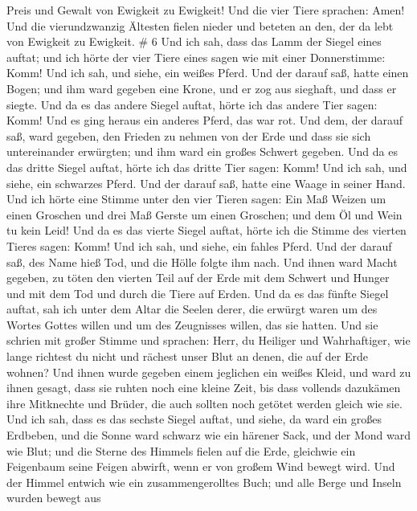 Preis und Gewalt von Ewigkeit zu Ewigkeit!  Und die vier
Tiere sprachen: Amen! Und die vierundzwanzig Ältesten fielen nieder und
beteten an den, der da lebt von Ewigkeit zu Ewigkeit. \# 6 
Und ich sah, dass das Lamm der Siegel eines auftat; und ich hörte der
vier Tiere eines sagen wie mit einer Donnerstimme: Komm! 
Und ich sah, und siehe, ein weißes Pferd. Und der darauf saß, hatte
einen Bogen; und ihm ward gegeben eine Krone, und er zog aus sieghaft,
und dass er siegte.  Und da es das andere Siegel auftat,
hörte ich das andere Tier sagen: Komm!  Und es ging heraus
ein anderes Pferd, das war rot. Und dem, der darauf saß, ward gegeben,
den Frieden zu nehmen von der Erde und dass sie sich untereinander
erwürgten; und ihm ward ein großes Schwert gegeben.  Und da
es das dritte Siegel auftat, hörte ich das dritte Tier sagen: Komm! Und
ich sah, und siehe, ein schwarzes Pferd. Und der darauf saß, hatte eine
Waage in seiner Hand.  Und ich hörte eine Stimme unter den
vier Tieren sagen: Ein Maß Weizen um einen Groschen und drei Maß Gerste
um einen Groschen; und dem Öl und Wein tu kein Leid!  Und da
es das vierte Siegel auftat, hörte ich die Stimme des vierten Tieres
sagen: Komm!  Und ich sah, und siehe, ein fahles Pferd. Und
der darauf saß, des Name hieß Tod, und die Hölle folgte ihm nach. Und
ihnen ward Macht gegeben, zu töten den vierten Teil auf der Erde mit dem
Schwert und Hunger und mit dem Tod und durch die Tiere auf Erden.
 Und da es das fünfte Siegel auftat, sah ich unter dem Altar
die Seelen derer, die erwürgt waren um des Wortes Gottes willen und um
des Zeugnisses willen, das sie hatten.  Und sie schrien mit
großer Stimme und sprachen: Herr, du Heiliger und Wahrhaftiger, wie
lange richtest du nicht und rächest unser Blut an denen, die auf der
Erde wohnen?  Und ihnen wurde gegeben einem jeglichen ein
weißes Kleid, und ward zu ihnen gesagt, dass sie ruhten noch eine kleine
Zeit, bis dass vollends dazukämen ihre Mitknechte und Brüder, die auch
sollten noch getötet werden gleich wie sie.  Und ich sah,
dass es das sechste Siegel auftat, und siehe, da ward ein großes
Erdbeben, und die Sonne ward schwarz wie ein härener Sack, und der Mond
ward wie Blut;  und die Sterne des Himmels fielen auf die
Erde, gleichwie ein Feigenbaum seine Feigen abwirft, wenn er von großem
Wind bewegt wird.  Und der Himmel entwich wie ein
zusammengerolltes Buch; und alle Berge und Inseln wurden bewegt aus
